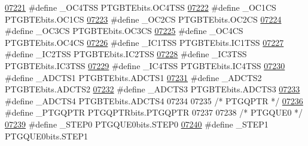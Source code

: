 \begin{DoxyCode}
\hypertarget{a00009_source_l07221}{}\hyperlink{a00009_a4ef9be95a5c7b8cc1b154ae53a1e1774}{07221} \textcolor{preprocessor}{#define \_OC4TSS PTGBTEbits.OC4TSS}
\hypertarget{a00009_source_l07222}{}\hyperlink{a00009_a9023777fa817c544e0f6c83be544269f}{07222} \textcolor{preprocessor}{#define \_OC1CS PTGBTEbits.OC1CS}
\hypertarget{a00009_source_l07223}{}\hyperlink{a00009_a576936aaf7a9f513f1cd714cce69034f}{07223} \textcolor{preprocessor}{#define \_OC2CS PTGBTEbits.OC2CS}
\hypertarget{a00009_source_l07224}{}\hyperlink{a00009_aa3449c2a004dbe986394340cc34a8608}{07224} \textcolor{preprocessor}{#define \_OC3CS PTGBTEbits.OC3CS}
\hypertarget{a00009_source_l07225}{}\hyperlink{a00009_ab381080d07870bdb9ac3bad0d3e2dc7c}{07225} \textcolor{preprocessor}{#define \_OC4CS PTGBTEbits.OC4CS}
\hypertarget{a00009_source_l07226}{}\hyperlink{a00009_a38493345a6309c77e3507abb9f619dc7}{07226} \textcolor{preprocessor}{#define \_IC1TSS PTGBTEbits.IC1TSS}
\hypertarget{a00009_source_l07227}{}\hyperlink{a00009_aec44c02820a18bf6775d6601671455b7}{07227} \textcolor{preprocessor}{#define \_IC2TSS PTGBTEbits.IC2TSS}
\hypertarget{a00009_source_l07228}{}\hyperlink{a00009_ade37e37e79f716834128a81b6486ee55}{07228} \textcolor{preprocessor}{#define \_IC3TSS PTGBTEbits.IC3TSS}
\hypertarget{a00009_source_l07229}{}\hyperlink{a00009_ab3466ddadef1af06df68027abd03b79c}{07229} \textcolor{preprocessor}{#define \_IC4TSS PTGBTEbits.IC4TSS}
\hypertarget{a00009_source_l07230}{}\hyperlink{a00009_abc999f1fb7bcb14dbb0581e794b769a1}{07230} \textcolor{preprocessor}{#define \_ADCTS1 PTGBTEbits.ADCTS1}
\hypertarget{a00009_source_l07231}{}\hyperlink{a00009_ad6a8d08f1190aed0b9c15b64cb379028}{07231} \textcolor{preprocessor}{#define \_ADCTS2 PTGBTEbits.ADCTS2}
\hypertarget{a00009_source_l07232}{}\hyperlink{a00009_aca9ef21055cdf2b9c7b83e8b7d9a7086}{07232} \textcolor{preprocessor}{#define \_ADCTS3 PTGBTEbits.ADCTS3}
\hypertarget{a00009_source_l07233}{}\hyperlink{a00009_a172b92d811659a2960737ee9117c0132}{07233} \textcolor{preprocessor}{#define \_ADCTS4 PTGBTEbits.ADCTS4}
07234 
07235 \textcolor{comment}{/* PTGQPTR */}
\hypertarget{a00009_source_l07236}{}\hyperlink{a00009_adea1a67b654c61dd9dca3ca73854648d}{07236} \textcolor{preprocessor}{#define \_PTGQPTR PTGQPTRbits.PTGQPTR}
07237 
07238 \textcolor{comment}{/* PTGQUE0 */}
\hypertarget{a00009_source_l07239}{}\hyperlink{a00009_a118ae00234c46386602743ebcf038af3}{07239} \textcolor{preprocessor}{#define \_STEP0 PTGQUE0bits.STEP0}
\hypertarget{a00009_source_l07240}{}\hyperlink{a00009_a075717a96a7af1eb4f51f697abcfaedc}{07240} \textcolor{preprocessor}{#define \_STEP1 PTGQUE0bits.STEP1}

\end{DoxyCode}

